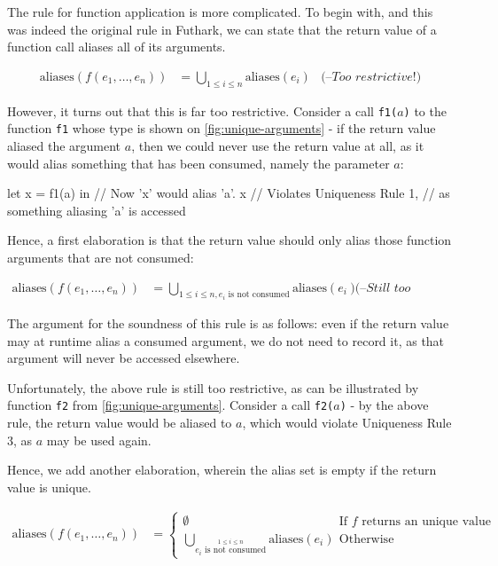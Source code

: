 \documentclass[oneside]{memoir}
\newcommand\aliases[1]{\textrm{aliases}(#1)}
\begin{document}
The rule for function application is more complicated.  To begin with,
and this was indeed the original rule in Futhark, we can state that the
return value of a function call aliases all of its arguments.

\begin{align*}
  \aliases{\textit{f}(e_{1}, \ldots, e_{n})} &= \bigcup_{1 \leq i \leq n} \aliases{e_{i}} & \textit{(--Too restrictive!)}
\end{align*}

However, it turns out that this is far too restrictive.  Consider a
call \texttt{f1($a$)} to the function \texttt{f1} whose type is shown
on \cref{fig:unique-arguments} - if the return value aliased the
argument $a$, then we could never use the return value at all, as it
would alias something that has been consumed, namely the parameter
$a$:

\begin{colorcode}
let x = f1(a) in // Now 'x' would alias 'a'.
x                // Violates Uniqueness Rule 1,
                 // as something aliasing 'a' is accessed
\end{colorcode}

Hence, a first elaboration is that the return value should only alias
those function arguments that are not consumed:

\begin{align*}
  \aliases{\textit{f}(e_{1}, \ldots, e_{n})} &= \bigcup_{1 \leq i \leq n, \text{$e_{i}$ is not consumed}} \aliases{e_{i}}  & \textit{(--Still too restrictive!)}
\end{align*}

The argument for the soundness of this rule is as follows: even if the
return value may at runtime alias a consumed argument, we do not need
to record it, as that argument will never be accessed elsewhere.

Unfortunately, the above rule is still too restrictive, as can be
illustrated by function \texttt{f2} from \cref{fig:unique-arguments}.
Consider a call \texttt{f2($a$)} - by the above rule, the return value
would be aliased to $a$, which would violate Uniqueness Rule 3, as $a$
may be used again.

Hence, we add another elaboration, wherein the alias set is empty if
the return value is unique.

\begin{align*}
  \aliases{f(e_{1}, \ldots, e_{n})} &=
  \begin{cases}
    \emptyset & \mbox{If $f$ returns an unique value}\\
    \bigcup_{\overset{1 \leq i \leq n}{\text{$e_{i}$ is not consumed}}} \aliases{e_{i}} & \mbox{Otherwise}
  \end{cases}
\end{align*}
\end{document}

